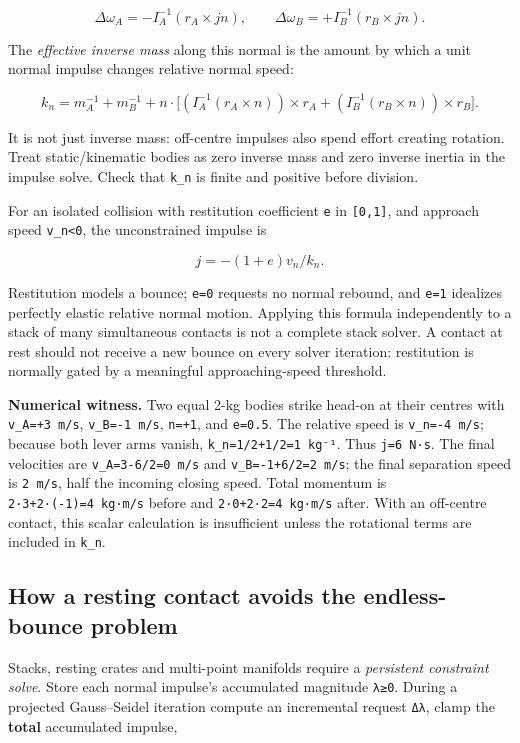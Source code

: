 \[
\Delta\omega_A=-I_A^{-1}(r_A\times jn),\qquad
\Delta\omega_B=+I_B^{-1}(r_B\times jn).
\]

The \emph{effective inverse mass} along this normal is the amount by which a unit normal impulse changes relative normal speed:

\[
k_n=m_A^{-1}+m_B^{-1}
+n\cdot\Big[
(I_A^{-1}(r_A\times n))\times r_A
+(I_B^{-1}(r_B\times n))\times r_B
\Big].
\]

It is not just inverse mass: off-centre impulses also spend effort creating rotation. Treat static/kinematic bodies as zero inverse mass and zero inverse inertia in the impulse solve. Check that \texttt{k\_n} is finite and positive before division.

For an isolated collision with restitution coefficient \texttt{e} in \texttt{{[}0,1{]}}, and approach speed \texttt{v\_n\textless{}0}, the unconstrained impulse is

\[
j=-(1+e)v_n/k_n.
\]

Restitution models a bounce; \texttt{e=0} requests no normal rebound, and \texttt{e=1} idealizes perfectly elastic relative normal motion. Applying this formula independently to a stack of many simultaneous contacts is not a complete stack solver. A contact at rest should not receive a new bounce on every solver iteration: restitution is normally gated by a meaningful approaching-speed threshold.

\textbf{Numerical witness.} Two equal 2-kg bodies strike head-on at their centres with \texttt{v\_A=+3\ m/s}, \texttt{v\_B=-1\ m/s}, \texttt{n=+1}, and \texttt{e=0.5}. The relative speed is \texttt{v\_n=-4\ m/s}; because both lever arms vanish, \texttt{k\_n=1/2+1/2=1\ kg⁻¹}. Thus \texttt{j=6\ N·s}. The final velocities are \texttt{v\textquotesingle{}\_A=3-6/2=0\ m/s} and \texttt{v\textquotesingle{}\_B=-1+6/2=2\ m/s}; the final separation speed is \texttt{2\ m/s}, half the incoming closing speed. Total momentum is \texttt{2·3+2·(-1)=4\ kg·m/s} before and \texttt{2·0+2·2=4\ kg·m/s} after. With an off-centre contact, this scalar calculation is insufficient unless the rotational terms are included in \texttt{k\_n}.

\subsection{How a resting contact avoids the endless-bounce problem}\label{02-foundations-ii-ch039-how-a-resting-contact-avoids-the-endless-bounce-problem}

Stacks, resting crates and multi-point manifolds require a \emph{persistent constraint solve}. Store each normal impulse's accumulated magnitude \texttt{λ≥0}. During a projected Gauss--Seidel iteration compute an incremental request \texttt{Δλ}, clamp the \textbf{total} accumulated impulse,

